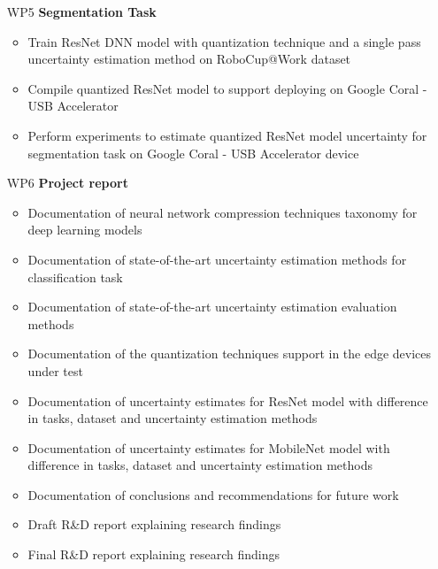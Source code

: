 \documentclass[rnd]{mas_proposal}
\begin{document}
\begin{enumerate}
    \item[WP5] \textbf{Segmentation Task}
        \begin{itemize}
        \item Train ResNet DNN model with quantization technique and a single pass uncertainty estimation method on RoboCup@Work dataset \cite{robocupdataset}
        \item Compile quantized ResNet model to support deploying on Google Coral - USB Accelerator
        \item Perform experiments to estimate quantized ResNet model uncertainty for segmentation task on Google Coral - USB Accelerator device
        \end{itemize}
        
    \item[WP6] \textbf{Project report}
        \begin{itemize}
        \item Documentation of neural network compression techniques taxonomy for deep learning models
        \item Documentation of state-of-the-art uncertainty estimation methods for classification task
        \item Documentation of state-of-the-art uncertainty estimation evaluation methods
        \item Documentation of the quantization techniques support in the edge devices under test
        \item Documentation of uncertainty estimates for ResNet model with difference in tasks, dataset and uncertainty estimation methods
        \item Documentation of uncertainty estimates for MobileNet model with difference in tasks, dataset and uncertainty estimation methods
        \item Documentation of conclusions and recommendations for future work
        \item Draft R\&D report explaining research findings
        \item Final R\&D report explaining research findings
        \end{itemize}
\end{enumerate}
\end{document}
